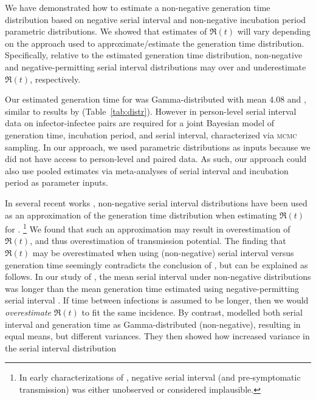 We have demonstrated how to estimate
a non-negative generation time distribution
based on negative serial interval
and non-negative incubation period parametric distributions.
We showed that estimates of $\Re(t)$ will vary depending on
the approach used to approximate/estimate the generation time distribution.
Specifically, relative to the estimated generation time distribution,
non-negative and negative-permitting serial interval distributions
may over and underestimate $\Re(t)$, respectively.
\par
Our estimated generation time for \covid was
Gamma-distributed with mean 4.08 and ,
similar to results by \citet{Ganyani2020} (Table~\ref{tab:distr}).
However in \citep{Ganyani2020}
person-level serial interval data on infector-infectee pairs
are required for a joint Bayesian model of
generation time, incubation period, and serial interval,
characterized via \textsc{mcmc} sampling.
In our approach, we used parametric distributions as inputs
because we did not have access to 
person-level and paired data.
As such, our approach could also use pooled estimates via meta-analyses of
serial interval and incubation period as parameter inputs.
\par
In several recent works \citep{You2020,Tang2020,Zhang2020,Zhang2020a},
non-negative serial interval distributions have been used
as an approximation of the generation time distribution
when estimating $\Re(t)$ for \covid.%
\footnote{In early characterizations of \covid
  \citep{Li2020,Zhang2020,Nishiura2020,Zhao2020,You2020},
  negative serial interval (and pre-symptomatic transmission)
  was either unobserved or considered implausible.}
We found that such an approximation may result in
overestimation of $\Re(t)$,
and thus overestimation of \covid transmission potential.
The finding that $\Re(t)$ may be overestimated
when using (non-negative) serial interval versus generation time
seemingly contradicts the conclusion of \citet{Britton2019},
but can be explained as follows.
In our study of \covid,
the mean serial interval under non-negative distributions \citep{Zhang2020,Nishiura2020}
was longer than the mean generation time
estimated using negative-permitting serial interval \citep{Du2020}.
If time between infections is assumed to be longer,
then we would \emph{overestimate} $\Re(t)$ to fit the same incidence.
By contrast, \citet{Britton2019} modelled
both serial interval and generation time as Gamma-distributed (non-negative),
resulting in equal means, but different variances.
They then showed how increased variance in the serial interval distribution
